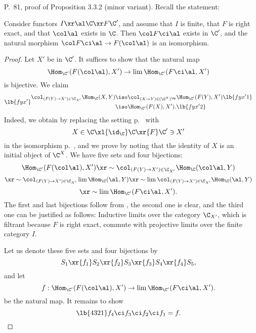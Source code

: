 \documentclass[12pt]{article}
\theoremstyle{remark}
\theoremstyle{definition}
\begin{document}
\begin{s}%
P.~81, proof of Proposition 3.3.2 (minor variant). Recall the statement:

\begin{prop}[Proposition 3.3.2 p.~81] 
Consider functors $I\xr\al\C\xr F\C'$, and assume that $I$ is finite, that $F$ is right exact, and that $\col\al$ exists in $\C$. Then $\col F\ci\al$ exists in $\C'$, and the natural morphism $\col F\ci\al\to F(\col\al)$ is an isomorphism. 
\end{prop} 

\begin{proof}
Let $X'$ be in $\C'$. It suffices to show that the natural map 
$$
\Hom_{\C'}(F(\col\al),X')\to\lim\Hom_{\C'}(F\ci\al,X')
$$ 
is bijective. We claim 
\begin{subequations}\lb{fyx'}%
\begin{align}
\col_{(F(Y)\to X')\in\C_{X'}}\Hom_\C(X,Y)&\iso\col_{(X\to Y)\in(\C^X)^{\op}}\Hom_{\C'}(F(Y),X')\lb{fyx'1}\\
&\iso\Hom_{\C'}(F(X),X').\lb{fyx'2}
\end{align}
\end{subequations}
Indeed, we obtain  by replacing the setting  p.~ with 
$$
X\in\C\xl{\id_\C}\C\xr{F}\C'\ni X' 
$$ 
in the isomorphism  p.~, and we prove  by noting that the identity of $X$ is an initial object of $\C^X$. We have five sets and four bijections: 
$$ 
\Hom_{\C'}(F(\col\al),X')\xr\sim\col_{(F(Y)\to X')\in\C_{X'}}\Hom_\C(\col\al,Y)
$$
$$
\xr\sim\col_{(F(Y)\to X')\in\C_{X'}}\lim\Hom_\C(\al,Y)\xr\sim\lim\col_{(F(Y)\to X')\in\C_{X'}}\Hom_\C(\al,Y)
$$
$$
\xr\sim\lim\Hom_{\C'}(F\ci\al,X'). 
$$ 
The first and last bijections follow from , the second one is clear, and the third one can be justified as follows: Inductive limits over the category $\C_{X'}$, which is filtrant because $F$ is right exact, commute with projective limits over the finite category $I$. 

Let us denote these five sets and four bijections by 
$$
S_1\xr{f_1}S_2\xr{f_2}S_3\xr{f_3}S_4\xr{f_4}S_5,
$$ 
and let 
$$
f:\Hom_{\C'}(F(\col\al),X')\to\lim\Hom_{\C'}(F\ci\al,X').
$$ 
be the natural map. It remains to show 
\begin{equation}\lb{4321}
f_4\ci f_3\ci f_2\ci f_1=f.
\end{equation} 


\end{proof}
\end{s}
\end{document}
